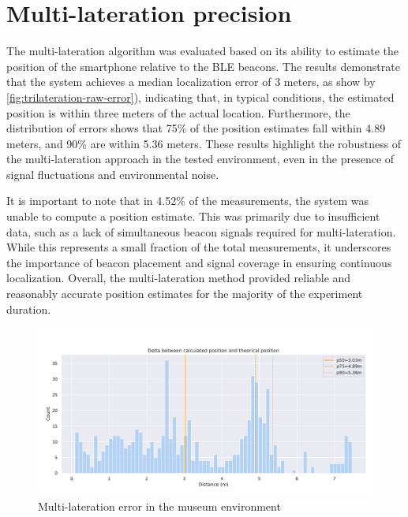 \section{Multi-lateration precision}

The multi-lateration algorithm was evaluated based on its ability to estimate the position of the smartphone relative to the BLE beacons. The results demonstrate that the system achieves a median localization error of 3 meters, as show by \autoref{fig:trilateration-raw-error}), indicating that, in typical conditions, the estimated position is within three meters of the actual location. Furthermore, the distribution of errors shows that 75\% of the position estimates fall within 4.89 meters, and 90\% are within 5.36 meters. These results highlight the robustness of the multi-lateration approach in the tested environment, even in the presence of signal fluctuations and environmental noise.

It is important to note that in 4.52\% of the measurements, the system was unable to compute a position estimate. This was primarily due to insufficient data, such as a lack of simultaneous beacon signals required for multi-lateration. While this represents a small fraction of the total measurements, it underscores the importance of beacon placement and signal coverage in ensuring continuous localization. Overall, the multi-lateration method provided reliable and reasonably accurate position estimates for the majority of the experiment duration.

\begin{figure}[h]
		\centering
		\includegraphics[width=\linewidth]{assets/museum-location-precision.pdf}
		\caption{Multi-lateration error in the museum environment}
		\label{fig:trilateration-raw-error}
\end{figure}


